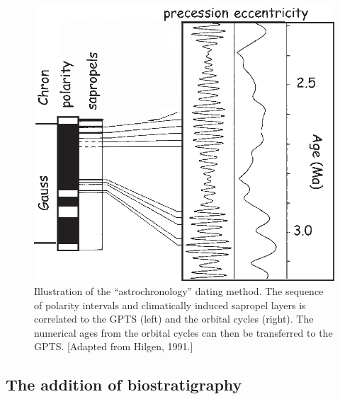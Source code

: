 \nocite{shackleton90} \nocite{hilgen91} 

\begin{figure}[h!tb]
 \centering  \includegraphics[width=11 cm]{EPSfiles/hilgen91.eps}
 \caption{Illustration of the  ``astrochronology'' dating method.  The sequence of polarity intervals  and climatically induced sapropel layers is correlated to the GPTS (left) and the orbital cycles (right).  The numerical ages from the orbital cycles  can then be transferred to the GPTS.  [Adapted from Hilgen, 1991.]}
 \label{fig:hilgen91}
 \end{figure} 


\subsection{The addition of biostratigraphy}
  
